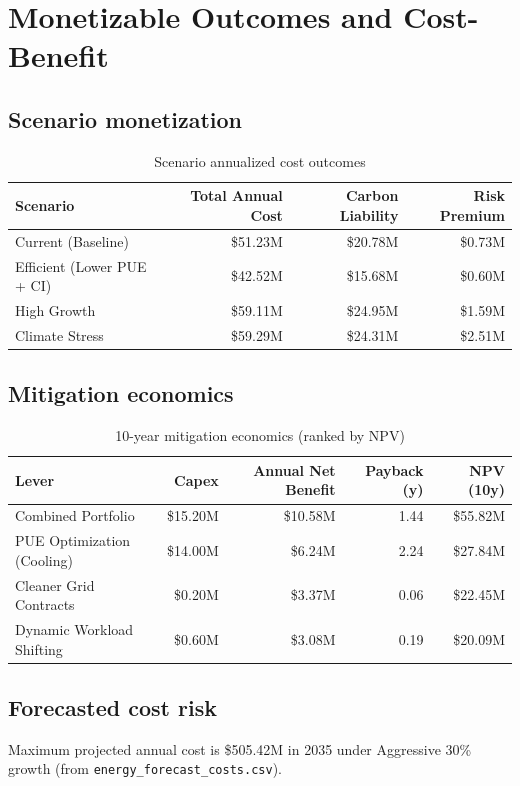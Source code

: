 \documentclass[11pt]{article}
\begin{document}
\section{Monetizable Outcomes and Cost-Benefit}
\subsection{Scenario monetization}
\begin{table}[H]
\centering
\caption{Scenario annualized cost outcomes}
\begin{tabular}{lrrr}
\toprule
Scenario & Total Annual Cost & Carbon Liability & Risk Premium \\
\midrule
Current (Baseline) & \$51.23M & \$20.78M & \$0.73M \\
Efficient (Lower PUE + CI) & \$42.52M & \$15.68M & \$0.60M \\
High Growth & \$59.11M & \$24.95M & \$1.59M \\
Climate Stress & \$59.29M & \$24.31M & \$2.51M \\
\bottomrule
\end{tabular}
\end{table}

\subsection{Mitigation economics}
\begin{table}[H]
\centering
\caption{10-year mitigation economics (ranked by NPV)}
\begin{tabular}{lrrrr}
\toprule
Lever & Capex & Annual Net Benefit & Payback (y) & NPV (10y) \\
\midrule
Combined Portfolio & \$15.20M & \$10.58M & 1.44 & \$55.82M \\
PUE Optimization (Cooling) & \$14.00M & \$6.24M & 2.24 & \$27.84M \\
Cleaner Grid Contracts & \$0.20M & \$3.37M & 0.06 & \$22.45M \\
Dynamic Workload Shifting & \$0.60M & \$3.08M & 0.19 & \$20.09M \\
\bottomrule
\end{tabular}
\end{table}

\subsection{Forecasted cost risk}
Maximum projected annual cost is \$505.42M in 2035 under Aggressive 30\% growth (from \texttt{energy\_forecast\_costs.csv}).
\end{document}
